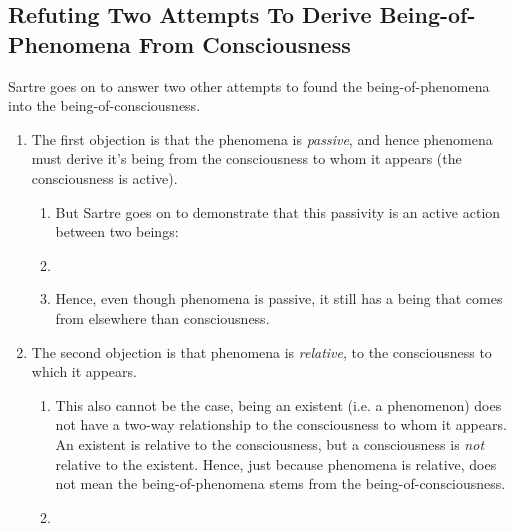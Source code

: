 \subsection{Refuting Two Attempts To Derive Being-of-Phenomena From Consciousness}
Sartre goes on to answer two other attempts to found the being-of-phenomena into the being-of-consciousness.
\begin{enumerate}
  \item The first objection is that the phenomena is \emph{passive}, and hence phenomena must derive it's being from the consciousness to whom it appears (the consciousness is active).
  \begin{enumerate}
    \item But Sartre goes on to demonstrate that this passivity is an active action between two beings:
    \item {}
    \item Hence, even though phenomena is passive, it still has a being that comes from elsewhere than consciousness.
  \end{enumerate}
  \item The second objection is that phenomena is \emph{relative}, to the consciousness to which it appears. 
  \begin{enumerate}
    \item This also cannot be the case, being an existent (i.e. a phenomenon) does not have a two-way relationship to the consciousness to whom it appears. An existent is relative to the consciousness, but a consciousness is \emph{not} relative to the existent. Hence, just because phenomena is relative, does not mean the being-of-phenomena stems from the being-of-consciousness.
    \item {}
  \end{enumerate}
\end{enumerate}

